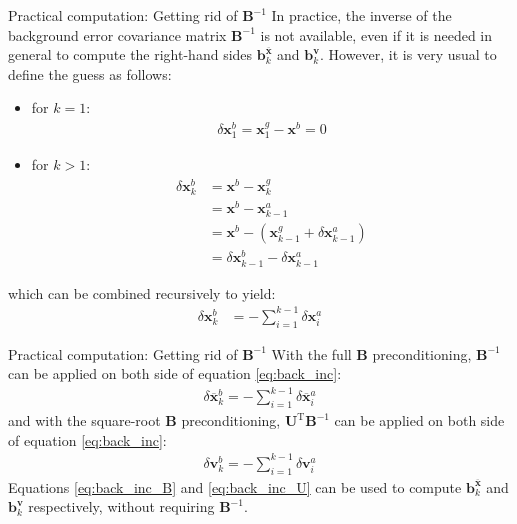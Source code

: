\documentclass[8pt]{beamer}
\begin{document}
\begin{frame}{Practical computation: Getting rid of $\mathbf{B}^{-1}$}
In practice, the inverse of the background error covariance matrix $\mathbf{B}^{-1}$ is not available, even if it is needed in general to compute the right-hand sides $\mathbf{b}^{\overline{\mathbf{x}}}_k$ and $\mathbf{b}^\mathbf{v}_k$. However, it is very usual to define the guess as follows:
\begin{itemize}
\item for $k = 1$:
\begin{align}
\delta \mathbf{x}^b_1 = \mathbf{x}^g_1 - \mathbf{x}^b = 0
\end{align}
\item for $k > 1$:
\begin{align}
\delta \mathbf{x}^b_k & = \mathbf{x}^b - \mathbf{x}^g_k \nonumber \\
& = \mathbf{x}^b - \mathbf{x}^a_{k-1} \nonumber \\
& = \mathbf{x}^b - \left(\mathbf{x}^g_{k-1} + \delta \mathbf{x}^a_{k-1}\right) \nonumber \\
& = \delta \mathbf{x}^b_{k-1} - \delta \mathbf{x}^a_{k-1}
\end{align}
\end{itemize}
which can be combined recursively to yield:
\begin{align}
\label{eq:back_inc}
\delta \mathbf{x}^b_k & = - \sum_{i=1}^{k-1} \delta \mathbf{x}^a_i
\end{align}
\end{frame}

\begin{frame}{Practical computation: Getting rid of $\mathbf{B}^{-1}$}
 With the full $\mathbf{B}$ preconditioning, $\mathbf{B}^{-1}$ can be applied on both side of equation \eqref{eq:back_inc}:
\begin{align}
\label{eq:back_inc_B}
\boxed{\delta \overline{\mathbf{x}}^b_k = - \sum_{i=1}^{k-1} \delta \overline{\mathbf{x}}^a_i}
\end{align}
and with the square-root $\mathbf{B}$ preconditioning, $\mathbf{U}^\mathrm{T} \mathbf{B}^{-1}$ can be applied on both side of equation \eqref{eq:back_inc}:
\begin{align}
\label{eq:back_inc_U}
\boxed{\delta \mathbf{v}^b_k = - \sum_{i=1}^{k-1} \delta \mathbf{v}^a_i}
\end{align}
Equations \eqref{eq:back_inc_B} and \eqref{eq:back_inc_U} can be used to compute $\mathbf{b}^{\overline{\mathbf{x}}}_k$ and $\mathbf{b}^\mathbf{v}_k$ respectively, without requiring $\mathbf{B}^{-1}$.
\end{frame}
\end{document}
